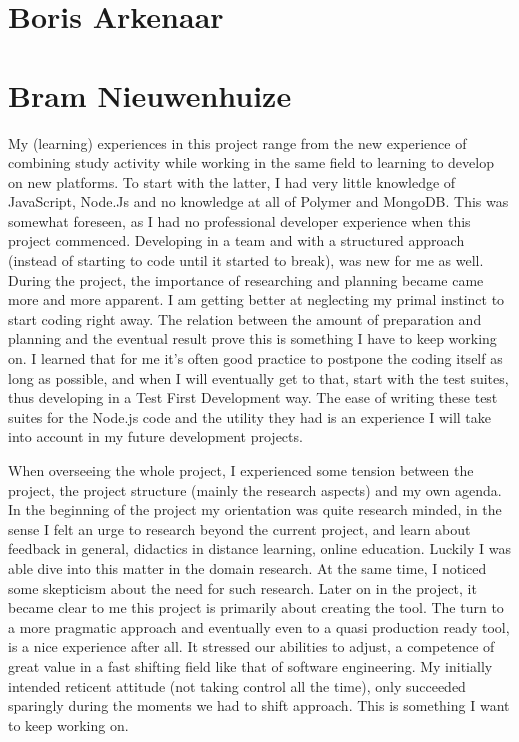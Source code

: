 
\section{Boris Arkenaar}

\section{Bram Nieuwenhuize}
My (learning) experiences in this project range from the new experience of 
combining study activity while working in the same field to learning to develop 
on new platforms.
To start with the latter, I had very little knowledge of 
JavaScript, Node.Js and no knowledge at all of Polymer and 
MongoDB. This was somewhat foreseen, as I had no 
professional developer experience when this project 
commenced. Developing in a team and with a
structured approach (instead of starting to code until it started to break),
was new for me as well. During the project, the importance of 
researching and planning became came more and more apparent. I am getting better
at neglecting my primal instinct to start coding right away. The relation 
between the amount of preparation and planning and the eventual result prove 
this is something I have to keep working on. I learned that for me it's often
good practice to postpone the coding itself as long as possible, and when I will
eventually get to that, start with the test suites, thus developing in a Test 
First Development way. The ease of writing these test suites for the Node.js
code and the utility they had is an experience I will take into account in my
future development projects.

When overseeing the whole project, I experienced some tension between the
project, the project structure (mainly the research aspects) and my own agenda.
In the beginning of the project my orientation was quite research minded, in the
sense I felt an urge to research beyond the current project, and learn about 
feedback in general, didactics in distance learning, online education. Luckily
I was able dive into this matter in the domain research. At the same time, I
noticed some skepticism about the need for such research. Later on in the 
project, it became clear to me this project is primarily about creating the 
tool. The turn to a more pragmatic approach and eventually even to a quasi 
production ready tool, is a nice experience after all. It stressed our 
abilities to adjust, a competence of great value in a fast shifting field like 
that of software engineering. My initially intended reticent attitude (not taking control all the time), only succeeded sparingly during the moments we had to shift approach. This is something I want to keep working on.


